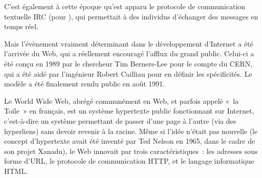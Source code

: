 C'est également à cette époque qu'est apparu le protocole de communication textuelle IRC (pour ), qui permettait à des individus d'échanger des messages en temps réel.

Mais l'évènement vraiment déterminant dans le développement d'Internet a été l'arrivée du Web, qui a réellement encouragé l'afflux du grand public. Celui-ci a été conçu en 1989 par le chercheur Tim Berners-Lee pour le compte du CERN, qui a été aidé par l'ingénieur Robert Cailliau pour en définir les spécificités. Le modèle a été finalement rendu public en août 1991.

Le World Wide Web, abrégé communément en Web, et parfois appelé «~la Toile~» en français, est un système hypertexte public fonctionnant sur Internet, c'est-à-dire un système permettant de passer d'une page à l'autre (via des hyperliens) sans devoir revenir à la racine. Même si l'idée n'était pas nouvelle (le concept d'hypertexte avait été inventé par Ted Nelson en 1965, dans le cadre de son projet Xanadu), le Web innovait par trois caractéristiques~: les adresses sous forme d'URL, le protocole de communication HTTP, et le langage informatique HTML. %

